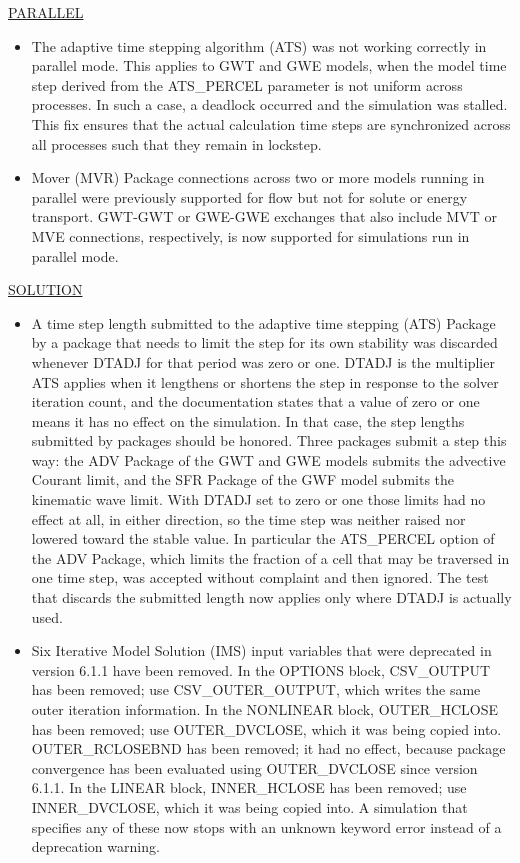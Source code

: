 \underline{PARALLEL}
\begin{itemize}
\item The adaptive time stepping algorithm (ATS) was not working correctly in parallel mode. This applies to GWT and GWE models, when the model time step derived from the ATS\_PERCEL parameter is not uniform across processes. In such a case, a deadlock occurred and the simulation was stalled. This fix ensures that the actual calculation time steps are synchronized across all processes such that they remain in lockstep.
\item Mover (MVR) Package connections across two or more models running in parallel were previously supported for flow but not for solute or energy transport.  GWT-GWT or GWE-GWE exchanges that also include MVT or MVE connections, respectively, is now supported for simulations run in parallel mode.
\end{itemize}

\underline{SOLUTION}
\begin{itemize}
\item A time step length submitted to the adaptive time stepping (ATS) Package by a package that needs to limit the step for its own stability was discarded whenever DTADJ for that period was zero or one.  DTADJ is the multiplier ATS applies when it lengthens or shortens the step in response to the solver iteration count, and the documentation states that a value of zero or one means it has no effect on the simulation.  In that case, the step lengths submitted by packages should be honored.  Three packages submit a step this way: the ADV Package of the GWT and GWE models submits the advective Courant limit, and the SFR Package of the GWF model submits the kinematic wave limit.  With DTADJ set to zero or one those limits had no effect at all, in either direction, so the time step was neither raised nor lowered toward the stable value.  In particular the ATS\_PERCEL option of the ADV Package, which limits the fraction of a cell that may be traversed in one time step, was accepted without complaint and then ignored.  The test that discards the submitted length now applies only where DTADJ is actually used.
\item Six Iterative Model Solution (IMS) input variables that were deprecated in version 6.1.1 have been removed. In the OPTIONS block, CSV\_OUTPUT has been removed; use CSV\_OUTER\_OUTPUT, which writes the same outer iteration information. In the NONLINEAR block, OUTER\_HCLOSE has been removed; use OUTER\_DVCLOSE, which it was being copied into. OUTER\_RCLOSEBND has been removed; it had no effect, because package convergence has been evaluated using OUTER\_DVCLOSE since version 6.1.1. In the LINEAR block, INNER\_HCLOSE has been removed; use INNER\_DVCLOSE, which it was being copied into. A simulation that specifies any of these now stops with an unknown keyword error instead of a deprecation warning.
\end{itemize}

